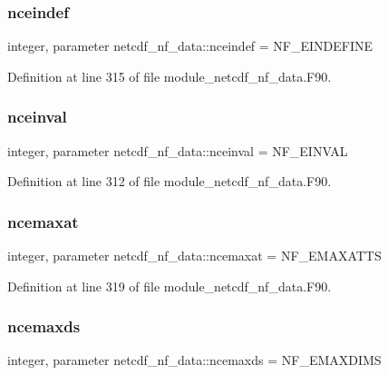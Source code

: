 \subsubsection{\texorpdfstring{nceindef}{nceindef}}
{\footnotesize\ttfamily integer, parameter netcdf\+\_\+nf\+\_\+data\+::nceindef = N\+F\+\_\+\+E\+I\+N\+D\+E\+F\+I\+NE}



Definition at line 315 of file module\+\_\+netcdf\+\_\+nf\+\_\+data.\+F90.

\mbox{\label{namespacenetcdf__nf__data_a3a5571519fa1d0f18858874ecb7f7b33}} 
\subsubsection{\texorpdfstring{nceinval}{nceinval}}
{\footnotesize\ttfamily integer, parameter netcdf\+\_\+nf\+\_\+data\+::nceinval = N\+F\+\_\+\+E\+I\+N\+V\+AL}



Definition at line 312 of file module\+\_\+netcdf\+\_\+nf\+\_\+data.\+F90.

\mbox{\label{namespacenetcdf__nf__data_a672787d382099c1a16156ef5df15d517}} 
\subsubsection{\texorpdfstring{ncemaxat}{ncemaxat}}
{\footnotesize\ttfamily integer, parameter netcdf\+\_\+nf\+\_\+data\+::ncemaxat = N\+F\+\_\+\+E\+M\+A\+X\+A\+T\+TS}



Definition at line 319 of file module\+\_\+netcdf\+\_\+nf\+\_\+data.\+F90.

\mbox{\label{namespacenetcdf__nf__data_a30bb2c6df61929c01a88049b1a88e01c}} 
\subsubsection{\texorpdfstring{ncemaxds}{ncemaxds}}
{\footnotesize\ttfamily integer, parameter netcdf\+\_\+nf\+\_\+data\+::ncemaxds = N\+F\+\_\+\+E\+M\+A\+X\+D\+I\+MS}



